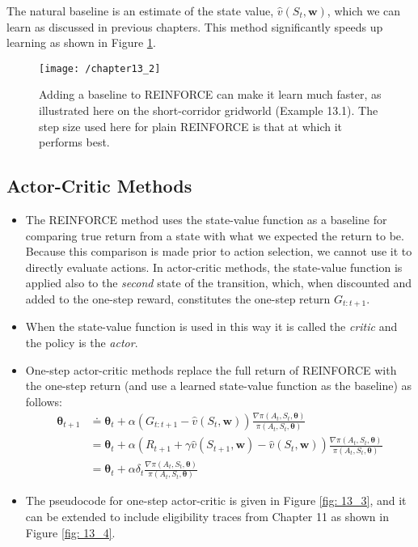The natural baseline is an estimate of the state value, $\hat{v}(S_t, \textbf{w})$, which we can learn as discussed in previous chapters. This method significantly speeds up learning as shown in Figure \ref{fig: 13_2}.
\begin{figure}
	\centering
	\texttt{[image: /chapter13\_2]}
	\caption{Adding a baseline to REINFORCE can make it learn much faster, as illustrated here on the short-corridor gridworld (Example 13.1). The step size used here for plain REINFORCE is that at which it performs best.}
	\label{fig: 13_2}
\end{figure}

\subsection{Actor-Critic Methods}
\begin{itemize}
\item The REINFORCE method uses the state-value function as a baseline for comparing true return from a state with what we expected the return to be. Because this comparison is made prior to action selection, we cannot use it to directly evaluate actions. In actor-critic methods, the state-value function is applied also to the \textit{second} state of the transition, which, when discounted and added to the one-step reward, constitutes the one-step return $G_{t:t+1}$.
\item When the state-value function is used in this way it is called the \textit{critic} and the policy is the \textit{actor}.
\item One-step actor-critic methods replace the full return of REINFORCE with the one-step return (and use a learned state-value function as the baseline) as follows:
\begin{align}
\boldsymbol{\theta}_{t+1} &\doteq \boldsymbol{\theta}_{t} + \alpha \left(G_{t:t+1} - \hat{v}(S_t, \textbf{w}) \right) \frac{\nabla \pi(A_t, S_t, \boldsymbol{\theta})}{\pi(A_t, S_t, \boldsymbol{\theta})} \\
&=  \boldsymbol{\theta}_{t} + \alpha \left(R_{t+1} + \gamma \hat{v}(S_{t+1}, \textbf{w}) - \hat{v}(S_t, \textbf{w})  \right) \frac{\nabla \pi(A_t, S_t, \boldsymbol{\theta})}{\pi(A_t, S_t, \boldsymbol{\theta})} \\
&=  \boldsymbol{\theta}_{t} + \alpha \delta_t \frac{\nabla \pi(A_t, S_t, \boldsymbol{\theta})}{\pi(A_t, S_t, \boldsymbol{\theta})} 
\end{align}
\item The pseudocode for one-step actor-critic is given in Figure \ref{fig: 13_3}, and it can be extended to include eligibility traces from Chapter 11 as shown in Figure \ref{fig: 13_4}.
\end{itemize}

